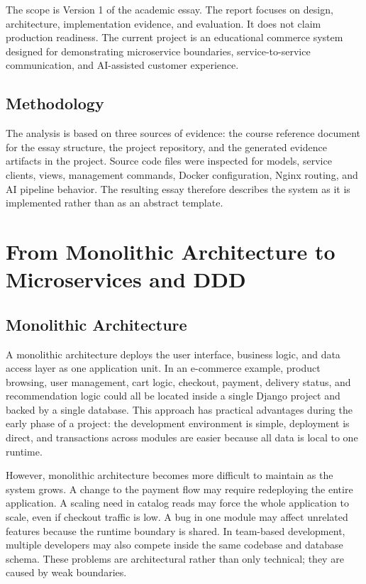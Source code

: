 \documentclass[12pt,a4paper]{article}
\begin{document}
The scope is Version 1 of the academic essay. The report focuses on design, architecture, implementation evidence, and evaluation. It does not claim production readiness. The current project is an educational commerce system designed for demonstrating microservice boundaries, service-to-service communication, and AI-assisted customer experience.

\subsection{Methodology}

The analysis is based on three sources of evidence: the course reference document for the essay structure, the project repository, and the generated evidence artifacts in the project. Source code files were inspected for models, service clients, views, management commands, Docker configuration, Nginx routing, and AI pipeline behavior. The resulting essay therefore describes the system as it is implemented rather than as an abstract template.

\section{From Monolithic Architecture to Microservices and DDD}

\subsection{Monolithic Architecture}

A monolithic architecture deploys the user interface, business logic, and data access layer as one application unit. In an e-commerce example, product browsing, user management, cart logic, checkout, payment, delivery status, and recommendation logic could all be located inside a single Django project and backed by a single database. This approach has practical advantages during the early phase of a project: the development environment is simple, deployment is direct, and transactions across modules are easier because all data is local to one runtime.

However, monolithic architecture becomes more difficult to maintain as the system grows. A change to the payment flow may require redeploying the entire application. A scaling need in catalog reads may force the whole application to scale, even if checkout traffic is low. A bug in one module may affect unrelated features because the runtime boundary is shared. In team-based development, multiple developers may also compete inside the same codebase and database schema. These problems are architectural rather than only technical; they are caused by weak boundaries.
\end{document}
